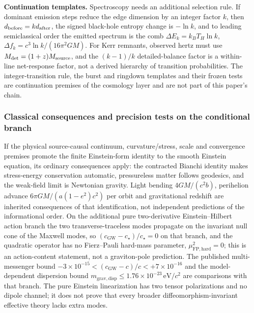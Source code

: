 \textbf{Continuation templates.} Spectroscopy needs an additional selection rule. If dominant
emission steps reduce the edge dimension by an integer factor \(k\), then
\(d_{\rm before}=k d_{\rm after}\), the signed black-hole entropy change is \(-\ln k\), and to
leading semiclassical order the emitted spectrum is the comb
\(\Delta E_k=k_BT_H\ln k\), \(\Delta f_k=c^3\ln k/(16\pi^2GM)\). For Kerr remnants, observed
hertz must use \(M_{\rm det}=(1+z)M_{\rm source}\), and the \((k-1)/k\) detailed-balance factor
is a within-line net-response factor, not a derived hierarchy of transition probabilities.
The integer-transition rule, the burst and ringdown templates and their frozen tests are
continuation premises of the cosmology layer and are not part of this paper's chain.

\subsubsection{Classical consequences and precision tests on the conditional branch}\label{512-classical-mechanics-from-emergent-gr}\label{513-precision-gravity-predictions-and-experimental-bounds}

If the physical source-causal continuum, curvature/stress, scale and convergence premises
promote the finite Einstein-form identity to the smooth Einstein equation, its ordinary
consequences apply: the contracted Bianchi identity makes stress-energy conservation automatic,
pressureless matter follows geodesics, and the weak-field limit is Newtonian gravity. Light
bending \(4GM/(c^2b)\), perihelion advance \(6\pi GM/(a(1-e^2)c^2)\) per orbit and gravitational
redshift are inherited consequences of that identification, not independent predictions of the
informational order. On the additional pure two-derivative Einstein--Hilbert action branch the
two transverse-traceless modes propagate on the invariant null cone of the Maxwell modes, so
\((c_{\mathrm{GW}}-c_\star)/c_\star=0\) on that branch, and the quadratic operator has no
Fierz--Pauli hard-mass parameter, \(\mu_{\mathrm{FP,hard}}^2=0\); this is an action-content
statement, not a graviton-pole prediction. The published multi-messenger bound
\(-3\times10^{-15}<(c_{\mathrm{GW}}-c)/c<+7\times10^{-16}\) and the model-dependent dispersion
bound \(m_{\mathrm{grav,disp}}\le1.76\times10^{-23}\,\mathrm{eV}/c^2\) are comparisons with that
branch. The pure Einstein linearization has two tensor polarizations and no dipole channel; it
does not prove that every broader diffeomorphism-invariant effective theory lacks extra modes.

